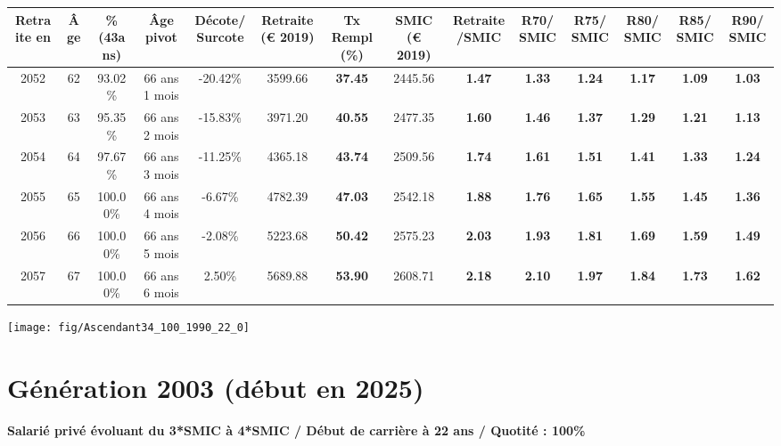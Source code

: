 \begin{adjustbox}{max width=\textwidth} 
\begin{tabular}[htb]{|c|c||c|c|c||c|c||c|c||c|c|c|c|c|} 
\hline 
 Retraite en &  Âge &  \%(43ans) &  Âge pivot &  Décote/Surcote &  Retraite (\euro{} 2019) &  Tx Rempl(\%) &  SMIC (\euro{} 2019) &  Retraite/SMIC &  R70/SMIC &  R75/SMIC &  R80/SMIC &  R85/SMIC &  R90/SMIC \\ 
\hline \hline 
 2052 &  62 &  93.02\% &  66 ans 1 mois &  -20.42\% &  3599.66 &  {\bf 37.45} &  2445.56 &  {\bf 1.47} &  {\bf 1.33} &  {\bf 1.24} &  {\bf 1.17} &  {\bf 1.09} &  {\bf 1.03} \\ 
\hline 
 2053 &  63 &  95.35\% &  66 ans 2 mois &  -15.83\% &  3971.20 &  {\bf 40.55} &  2477.35 &  {\bf 1.60} &  {\bf 1.46} &  {\bf 1.37} &  {\bf 1.29} &  {\bf 1.21} &  {\bf 1.13} \\ 
\hline 
 2054 &  64 &  97.67\% &  66 ans 3 mois &  -11.25\% &  4365.18 &  {\bf 43.74} &  2509.56 &  {\bf 1.74} &  {\bf 1.61} &  {\bf 1.51} &  {\bf 1.41} &  {\bf 1.33} &  {\bf 1.24} \\ 
\hline 
 2055 &  65 &  100.00\% &  66 ans 4 mois &  -6.67\% &  4782.39 &  {\bf 47.03} &  2542.18 &  {\bf 1.88} &  {\bf 1.76} &  {\bf 1.65} &  {\bf 1.55} &  {\bf 1.45} &  {\bf 1.36} \\ 
\hline 
 2056 &  66 &  100.00\% &  66 ans 5 mois &  -2.08\% &  5223.68 &  {\bf 50.42} &  2575.23 &  {\bf 2.03} &  {\bf 1.93} &  {\bf 1.81} &  {\bf 1.69} &  {\bf 1.59} &  {\bf 1.49} \\ 
\hline 
 2057 &  67 &  100.00\% &  66 ans 6 mois &  2.50\% &  5689.88 &  {\bf 53.90} &  2608.71 &  {\bf 2.18} &  {\bf 2.10} &  {\bf 1.97} &  {\bf 1.84} &  {\bf 1.73} &  {\bf 1.62} \\ 
\hline 
\hline 
\end{tabular} 
\end{adjustbox} 
 
 \vspace{0.1cm} 

 {\hspace{-2.2cm}\texttt{[image: fig/Ascendant34\_100\_1990\_22\_0]}} 

\newpage 
 
\section{Génération 2003 (début en 2025)\label{Ascendant34_100_2003_22_0}} 
 
{\bf \noindent Salarié privé évoluant du 3*SMIC à 4*SMIC / Début de carrière à 22 ans / Quotité : 100\%}  ~ 

